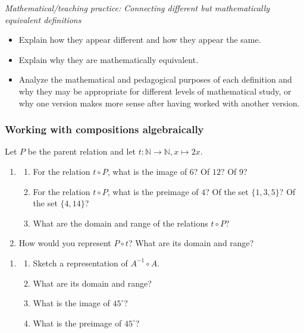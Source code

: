 \documentclass[11pt]{article}
\newcommand{\N}{\mathbb{N}}
\newcommand\degrees{^\circ}
\theoremstyle{definition}
\begin{document}
\vfill 
{\it Mathematical/teaching practice: Connecting different but mathematically equivalent definitions}
\begin{itemize}
\item Explain how they appear different and how they appear the same.
\item Explain why they are mathematically equivalent. 
\item Analyze the mathematical and pedagogical purposes of each definition and why they may be appropriate for different levels of mathematical study, or why one version makes more sense after having worked with another version.
\end{itemize}

\newpage
\subsubsection*{Working with compositions algebraically}
Let $P$ be the parent relation and let $t:\N\to \N, x\mapsto 2x$. 

\begin{enumerate}
\item \begin{enumerate}
	\item For the relation $t\circ P$, what is the image of $6$? Of $12$? Of $9$?

	\item For the relation $t\circ P$, what is the preimage of $4$? Of the set $\{1, 3, 5\}$? Of the set $\{4,14\}$?
	
	\item What are the domain and range of the relations $t\circ P$?

	\end{enumerate}
	\bigskip
	\item How would you represent $P\circ t$? What are its domain and range?
\end{enumerate}

\vfill 

\begin{enumerate}[resume]
\item  \begin{enumerate}
	\item Sketch a representation of $A^{-1}\circ A$. 
	\item What are its domain and range? 
	\item What is the image of $45\degrees$? 
	\item What is the preimage of $45\degrees$? 
	\end{enumerate}
\end{enumerate}	
\end{document}
